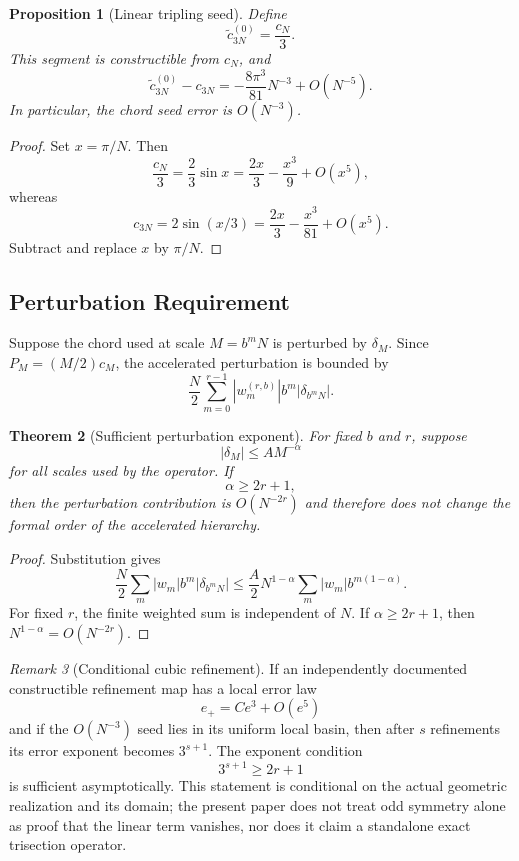 \documentclass[11pt]{article}
\newtheorem{theorem}{Theorem}[section]
\newtheorem{proposition}[theorem]{Proposition}
\theoremstyle{remark}
\newtheorem{remark}[theorem]{Remark}
\begin{document}
\begin{proposition}[Linear tripling seed]
Define
\[
  \widetilde c^{(0)}_{3N}=\frac{c_N}{3}.
\]
This segment is constructible from $c_N$, and
\[
  \widetilde c^{(0)}_{3N}-c_{3N}
  =-\frac{8\pi^3}{81}N^{-3}+O(N^{-5}).
\]
In particular, the chord seed error is $O(N^{-3})$.
\end{proposition}

\begin{proof}
Set $x=\pi/N$.  Then
\[
  \frac{c_N}{3}=\frac{2}{3}\sin x
  =\frac{2x}{3}-\frac{x^3}{9}+O(x^5),
\]
whereas
\[
  c_{3N}=2\sin(x/3)
  =\frac{2x}{3}-\frac{x^3}{81}+O(x^5).
\]
Subtract and replace $x$ by $\pi/N$.
\end{proof}

\subsection{Perturbation Requirement}

Suppose the chord used at scale $M=b^mN$ is perturbed by $\delta_M$.  Since
$P_M=(M/2)c_M$, the accelerated perturbation is bounded by
\[
  \frac{N}{2}\sum_{m=0}^{r-1}
  |w_m^{(r,b)}|b^m|\delta_{b^mN}|.
\]

\begin{theorem}[Sufficient perturbation exponent]
For fixed $b$ and $r$, suppose
\[
  |\delta_M|\le AM^{-\alpha}
\]
for all scales used by the operator.  If
\[
  \alpha\ge2r+1,
\]
then the perturbation contribution is $O(N^{-2r})$ and therefore does not
change the formal order of the accelerated hierarchy.
\end{theorem}

\begin{proof}
Substitution gives
\[
\frac{N}{2}\sum_m|w_m|b^m|\delta_{b^mN}|
\le
\frac{A}{2}N^{1-\alpha}
\sum_m|w_m|b^{m(1-\alpha)}.
\]
For fixed $r$, the finite weighted sum is independent of $N$.  If
$\alpha\ge2r+1$, then $N^{1-\alpha}=O(N^{-2r})$.
\end{proof}

\begin{remark}[Conditional cubic refinement]
If an independently documented constructible refinement map has a local error
law
\[
  e_+=Ce^3+O(e^5)
\]
and if the $O(N^{-3})$ seed lies in its uniform local basin, then after $s$
refinements its error exponent becomes $3^{s+1}$.  The exponent condition
\[
  3^{s+1}\ge2r+1
\]
is sufficient asymptotically.  This statement is conditional on the actual
geometric realization and its domain; the present paper does not treat odd
symmetry alone as proof that the linear term vanishes, nor does it claim a
standalone exact trisection operator.
\end{remark}
\end{document}
